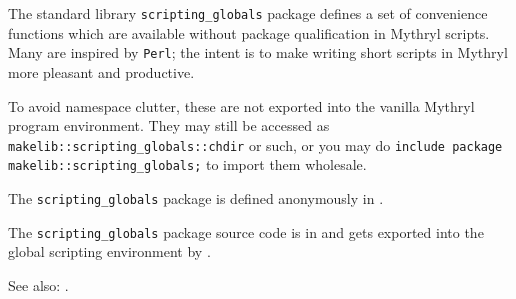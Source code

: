 
The standard library {\tt scripting\_globals} package defines a set of convenience functions 
which are available without package qualification in Mythryl scripts.  
Many are inspired by {\tt Perl}; the 
intent is to make writing short scripts in Mythryl more pleasant and productive.

To avoid 
namespace clutter, these are not exported into the vanilla Mythryl program 
environment.  They may still be accessed as {\tt makelib::scripting\_globals::chdir} 
or such, or you may do {\tt include package   makelib::scripting\_globals;} to import 
them wholesale.

The {\tt scripting\_globals} package is defined anonymously in 
.

The {\tt scripting\_globals} package source code is in 
and gets exported into the global scripting environment by 
 .

See also:  .



